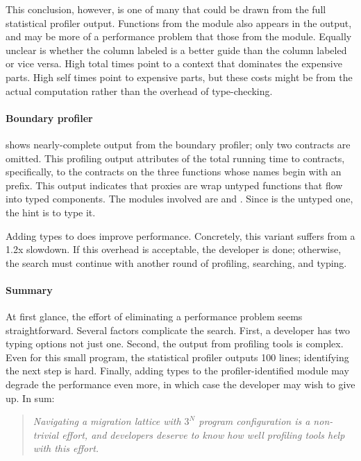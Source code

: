 This conclusion, however, is one of many that could be drawn from the full
statistical profiler output.  Functions from the  module also appears in the output,
and may be more of a performance problem that those from the  module.  Equally
unclear is whether the column labeled  is a better guide than
the column labeled  or vice versa.  High
total times point to a context that dominates the expensive parts.  High self
times point to expensive parts, but these costs might be from the actual
computation rather than the overhead of type-checking.

\paragraph{Boundary profiler}  shows nearly-complete
output from the boundary profiler; only two contracts are omitted.  This
profiling output attributes  of the total running time to
contracts, specifically, to the contracts on the three functions whose names
begin with an  prefix.
This output indicates that proxies are
wrap untyped functions that flow into typed components. The modules involved are
 and .  Since  is the untyped one, the hint is to
type it.

Adding types to  does improve performance. Concretely, this variant
suffers from a 1.2x slowdown.  If this overhead is acceptable, the developer is
done; otherwise, the search must continue with another round of
profiling, searching, and typing.


\paragraph{Summary}

At first glance, the effort of eliminating a performance problem seems
straightforward. Several factors complicate the search. First, a
developer has two typing options not just one. Second, the output from
profiling tools is complex. Even for this small program, the statistical
profiler outputs 100 lines;
identifying the next step is hard. Finally, adding types to the
profiler-identified module may degrade the performance even more, in which case
the developer may wish to give up. In sum:

\begin{quote} \em
Navigating a migration lattice with
$3^N$ program configuration is a non-trivial effort, and developers deserve to
know how well profiling tools help with this effort.
\end{quote}

